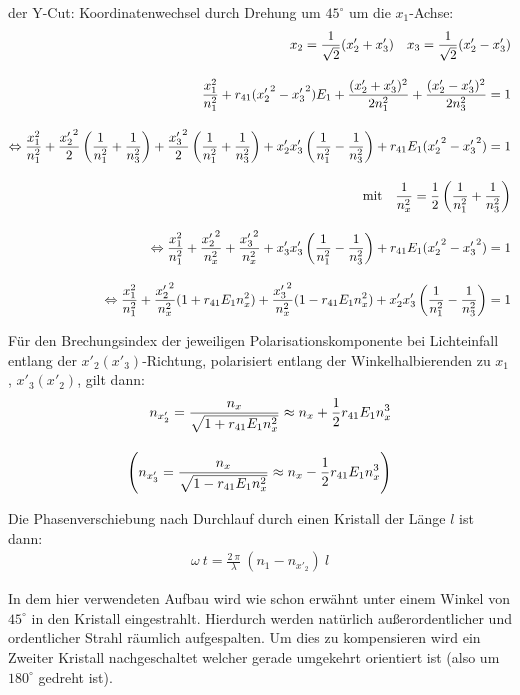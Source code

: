 \documentclass[12pt]{article}
\begin{document}
der Y-Cut: Koordinatenwechsel durch Drehung um $45^\circ$ um die $x_1$-Achse:
\begin{align*}
 \notag x_2 = \frac{1}{\sqrt{2}} (x'_2 + x'_3) \quad x_3 = \frac{1}{\sqrt{2}} (x'_2 - x'_3) \\[10pt] 
 \frac{x_1^2}{n_1^2} + r_{41} ( {x'_2}^2 - {x'_3}^2) E_1 + \frac{(x'_2 + x'_3)^2}{2 n_1^2} + \frac{(x'_2 - x'_3)^2}{2 n_3^2} = 1\\[10pt]
\notag \Leftrightarrow \frac{x_1^2}{n_1^2} + \frac{{x'_2}^2}{2} \left(\frac{1}{n_1^2} + \frac{1}{n_3^2}\right) + \frac{{x'_3}^2}{2} \left(\frac{1}{n_1^2} + \frac{1}{n_3^2}\right) + x'_2 x'_3 \left(\frac{1}{n_1^2} - \frac{1}{n_3^2}\right) + r_{41} E_1 ({x'_2}^2 - {x'_3}^2) = 1 \\[10pt]
\notag \textnormal{mit} \quad \frac{1}{n_x^2} = \frac{1}{2}\left(\frac{1}{n_1^2} + \frac{1}{n_3^2}\right) \\[10pt]
\notag \Leftrightarrow \frac{x_1^2}{n_1^2} + \frac{{x'_2}^2}{n_x^2} + \frac{{x'_3}^2}{n_x^2} + x'_3 x'_3 \left(\frac{1}{n_1^2} - \frac{1}{n_3^2} \right) + r_{41} E_1 ({x'_2}^2 - {x'_3}^2) = 1 \\[10pt]
\notag \Leftrightarrow \frac{x_1^2}{n_1^2} + \frac{{x'_2}^2}{n_x^2} (1 + r_{41} E_1 n_x^2) + \frac{{x'_3}^2}{n_x^2} (1 - r_{41} E_1 n_x^2) + x'_2 x'_3 \left(\frac{1}{n_1^2} - \frac{1}{n_3^2}\right) = 1
\end{align*}

Für den Brechungsindex der jeweiligen Polarisationskomponente bei Lichteinfall entlang der $x'_2 (x'_3)$-Richtung, polarisiert entlang der Winkelhalbierenden zu $x_1$, $x'_3 (x'_2)$, gilt dann:
\begin{align}
 n_{x'_2} = \frac{n_x}{\sqrt{1 + r_{41} E_1 n_x^2}} \approx n_x + \frac{1}{2} r_{41} E_1 n_x^3 \\[10pt]
\notag \left( n_{x'_3} = \frac{n_x}{\sqrt{1 - r_{41} E_1 n_x^2}} \approx n_x - \frac{1}{2} r_{41} E_1 n_x^3 \right)
\end{align}

Die Phasenverschiebung nach Durchlauf durch einen Kristall der Länge $l$ ist dann:
\begin{align}
 \omega~t = \frac{2~\pi}{\lambda}~(n_1 - n_{x'_2})~l
\end{align}

In dem hier verwendeten Aufbau wird wie schon erwähnt unter einem Winkel von $45^\circ$ in den Kristall eingestrahlt. Hierdurch werden natürlich außerordentlicher und ordentlicher Strahl räumlich aufgespalten. Um dies zu kompensieren wird ein Zweiter Kristall nachgeschaltet welcher gerade umgekehrt orientiert ist (also um $180^\circ$ gedreht ist).
\end{document}
